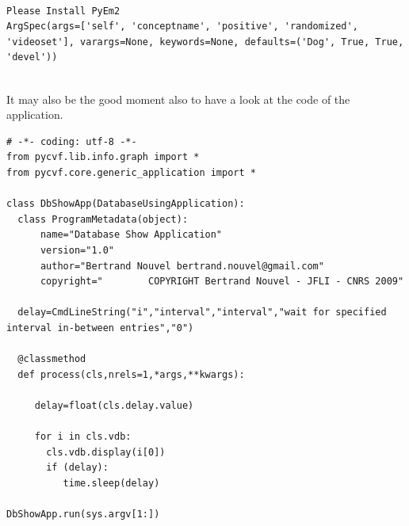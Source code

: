\documentclass{report}
\begin{document}
{\small  \tt
\begin{verbatim}
Please Install PyEm2
ArgSpec(args=['self', 'conceptname', 'positive', 'randomized', 'videoset'], varargs=None, keywords=None, defaults=('Dog', True, True, 'devel'))


\end{verbatim}
}




It may also be the good moment also to have a look at the code of the application.






\begin{lstlisting}
# -*- coding: utf-8 -*-
from pycvf.lib.info.graph import *
from pycvf.core.generic_application import *

class DbShowApp(DatabaseUsingApplication):
  class ProgramMetadata(object):
      name="Database Show Application"
      version="1.0"
      author="Bertrand Nouvel bertrand.nouvel@gmail.com"
      copyright="        COPYRIGHT Bertrand Nouvel - JFLI - CNRS 2009"

  delay=CmdLineString("i","interval","interval","wait for specified interval in-between entries","0")                             

  @classmethod
  def process(cls,nrels=1,*args,**kwargs):
                                                                                       
     delay=float(cls.delay.value)

     for i in cls.vdb:
       cls.vdb.display(i[0])
       if (delay):
          time.sleep(delay)
       
DbShowApp.run(sys.argv[1:])

\end{lstlisting}
\end{document}

